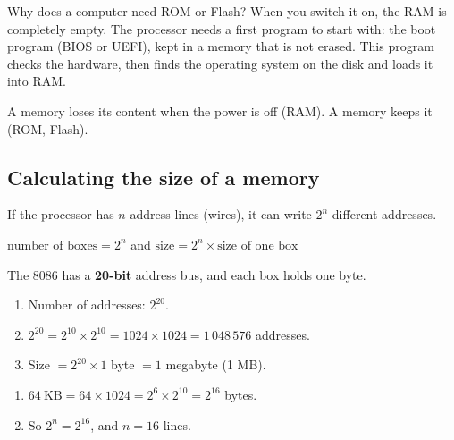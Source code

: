 \begin{hal}
    Why does a computer need ROM or Flash? When you switch it on, the RAM is completely empty. The processor
    needs a first program to start with: the boot program (BIOS or UEFI), kept in a memory that is not erased.
    This program checks the hardware, then finds the operating system on the disk and loads it into RAM.
\end{hal}

\begin{tarif}
    A  memory loses its content when the power is off (RAM).
    A  memory keeps it (ROM, Flash).
\end{tarif}

\subsection{Calculating the size of a memory}
If the processor has $n$ address lines (wires), it can write $2^n$ different addresses.

\begin{tarif}
    $\text{number of boxes} = 2^{n}$ \qquad and \qquad
    $\text{size} = 2^{n} \times \text{size of one box}$
\end{tarif}

\begin{khatwa}
    The 8086 has a \textbf{20-bit} address bus, and each box holds one byte.
    \begin{enumerate}
        \item Number of addresses: $2^{20}$.
        \item $2^{20} = 2^{10} \times 2^{10} = 1024 \times 1024 = 1\,048\,576$ addresses.
        \item Size $= 2^{20} \times 1$ byte $= 1$ megabyte (1 MB).
    \end{enumerate}
\end{khatwa}

\begin{khatwa}
    \begin{enumerate}
        \item $64\ \text{KB} = 64 \times 1024 = 2^{6} \times 2^{10} = 2^{16}$ bytes.
        \item So $2^{n} = 2^{16}$, and $n = 16$ lines.
    \end{enumerate}
\end{khatwa}

